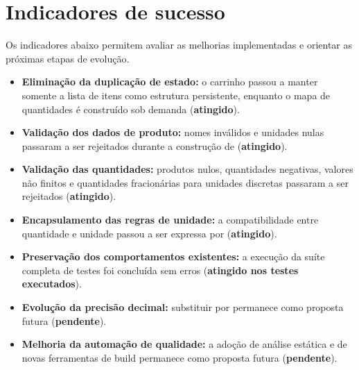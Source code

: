 \section{Indicadores de sucesso}

Os indicadores abaixo permitem avaliar as melhorias implementadas e orientar as próximas etapas de evolução.

\begin{itemize}

\item \textbf{Eliminação da duplicação de estado:} o carrinho passou a manter somente a lista de itens como estrutura persistente, enquanto o mapa de quantidades é construído sob demanda (\textbf{atingido}).

\item \textbf{Validação dos dados de produto:} nomes inválidos e unidades nulas passaram a ser rejeitados durante a construção de  (\textbf{atingido}).

\item \textbf{Validação das quantidades:} produtos nulos, quantidades negativas, valores não finitos e quantidades fracionárias para unidades discretas passaram a ser rejeitados (\textbf{atingido}).

\item \textbf{Encapsulamento das regras de unidade:} a compatibilidade entre quantidade e unidade passou a ser expressa por  (\textbf{atingido}).

\item \textbf{Preservação dos comportamentos existentes:} a execução da suíte completa de testes foi concluída sem erros (\textbf{atingido nos testes executados}).

\item \textbf{Evolução da precisão decimal:} substituir  por  permanece como proposta futura (\textbf{pendente}).

\item \textbf{Melhoria da automação de qualidade:} a adoção de análise estática e de novas ferramentas de build permanece como proposta futura (\textbf{pendente}).

\end{itemize}

